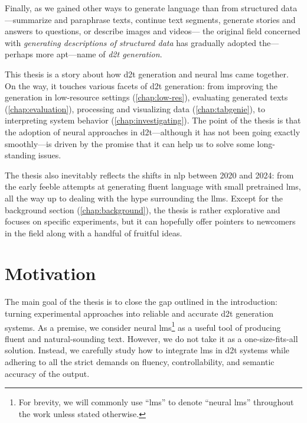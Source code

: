 Finally, as we gained other ways to generate language than from structured data---summarize and paraphrase texts, continue text segments, generate stories and answers to questions, or describe images and videos---%
the original field concerned with \textit{generating descriptions of structured data} has gradually adopted the---perhaps more apt---name of \emph{\ac{d2t} generation}.

This thesis is a story about how \acl{d2t} generation and neural \aclp{lm} came together. On the way, it touches various facets of \ac{d2t} generation: from improving the generation in low-resource settings (\autoref{chap:low-res}), evaluating generated texts (\autoref{chap:evaluation}), processing and visualizing data (\autoref{chap:tabgenie}), to interpreting system behavior (\autoref{chap:investigating}). The point of the thesis is that the adoption of neural approaches in \ac{d2t}---although it has not been going exactly smoothly---is driven by the promise that it can help us to solve some long-standing issues.

The thesis also inevitably reflects the shifts in \ac{nlp} between 2020 and 2024: from the early feeble attempts at generating fluent language with small pretrained \acp{lm}, all the way up to dealing with the hype surrounding the \acp{llm}.  Except for the background section (\autoref{chap:background}), the thesis is rather explorative and focuses on specific experiments, but it can hopefully offer pointers to newcomers in the field along with a handful of fruitful ideas.




\section{Motivation}
\label{sec:rq}

The main goal of the thesis is to close the gap outlined in the introduction: turning experimental approaches into reliable and accurate \ac{d2t} generation systems. As a premise, we consider neural \acp{lm}\footnote{For brevity, we will commonly use ``\acp{lm}'' to denote ``neural \acp{lm}'' throughout the work unless stated otherwise.} as a useful tool of producing fluent and natural-sounding text.
However, we do not take it as a one-size-fits-all solution. Instead, we carefully study how to integrate \acp{lm} in \ac{d2t} systems while adhering to all the strict demands on fluency, controllability, and semantic accuracy of the output.

